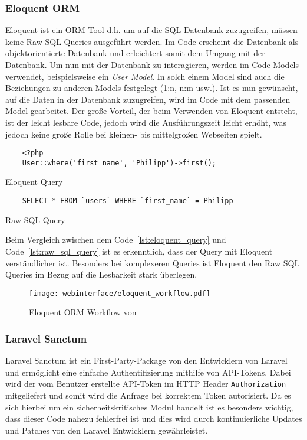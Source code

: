 \subsubsection{Eloquent ORM}
Eloquent ist ein \ac*{ORM} Tool d.h. um auf die \acs*{SQL} Datenbank zuzugreifen,
müssen keine Raw \acs*{SQL} Queries ausgeführt werden. Im Code erscheint die
Datenbank als objektorientierte Datenbank und erleichtert somit dem Umgang mit
der Datenbank. Um nun mit der Datenbank zu interagieren, werden im Code Models
verwendet, beispielsweise ein \textit{User Model}. In solch einem Model sind auch die
Beziehungen zu anderen Models festgelegt (1:n, n:m usw.). Ist es nun gewünscht,
auf die Daten in der Datenbank zuzugreifen, wird im Code mit dem passenden Model
gearbeitet. Der große Vorteil, der beim Verwenden von Eloquent entsteht, ist der
leicht lesbare Code, jedoch wird die Ausführungszeit leicht erhöht, was jedoch
keine große Rolle bei kleinen- bis mittelgroßen Webseiten spielt.

\begin{listing}[H]
  \begin{verbatim}
    <?php
    User::where('first_name', 'Philipp')->first();
  \end{verbatim}
  \caption{Eloquent Query}
  \label{lst:eloquent_query}
\end{listing}

\begin{listing}[H]
  \begin{verbatim}
    SELECT * FROM `users` WHERE `first_name` = Philipp
  \end{verbatim}
  \caption{Raw SQL Query}
  \label{lst:raw_sql_query}
\end{listing}

Beim Vergleich zwischen dem Code~\ref{lst:eloquent_query} und
Code~\ref{lst:raw_sql_query} ist es erkenntlich, dass der Query mit Eloquent
verständlicher ist. Besonders bei komplexeren Queries ist Eloquent den Raw
\acs*{SQL} Queries im Bezug auf die Lesbarkeit stark überlegen.

\begin{figure}[H]
  \centering
  \texttt{[image: webinterface/eloquent\_workflow.pdf]}
  \caption{Eloquent ORM Workflow von }
\end{figure}

\subsubsection{Laravel Sanctum}
Laravel Sanctum ist ein First-Party-Package von den Entwicklern von Laravel und
ermöglicht eine einfache Authentifizierung mithilfe von API-Tokens. Dabei wird
der vom Benutzer erstellte API-Token im HTTP Header \verb|Authorization|
mitgeliefert und somit wird die Anfrage bei korrektem Token autorisiert. Da es sich hierbei um ein
sicherheitskritisches Modul handelt ist es besonders wichtig, dass dieser Code
nahezu fehlerfrei ist und dies wird durch kontinuierliche Updates und Patches
von den Laravel Entwicklern gewährleistet.
 
